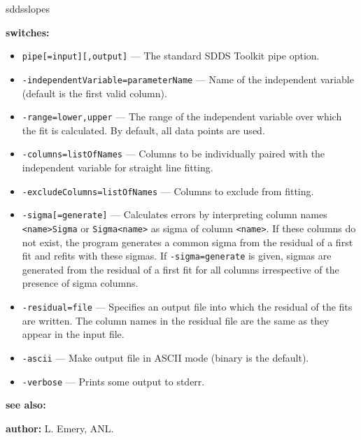 \begin{sddsprog}{sddsslopes}
  \item \textbf{switches:}
  \begin{itemize}
    \item \verb|pipe[=input][,output]| --- The standard SDDS Toolkit pipe option.
    \item \verb|-independentVariable=parameterName| --- Name of the independent variable (default is the first valid column).
    \item \verb|-range=lower,upper| --- The range of the independent variable over which the fit is calculated. By default, all data points are used.
    \item \verb|-columns=listOfNames| --- Columns to be individually paired with the independent variable for straight line fitting.
    \item \verb|-excludeColumns=listOfNames| --- Columns to exclude from fitting.
    \item \verb|-sigma[=generate]| --- Calculates errors by interpreting column names \verb|<name>Sigma| or \verb|Sigma<name>| as sigma of column \verb|<name>|. If these columns do not exist, the program generates a common sigma from the residual of a first fit and refits with these sigmas. If \verb|-sigma=generate| is given, sigmas are generated from the residual of a first fit for all columns irrespective of the presence of sigma columns.
    \item \verb|-residual=file| --- Specifies an output file into which the residual of the fits are written. The column names in the residual file are the same as they appear in the input file.
    \item \verb|-ascii| --- Make output file in ASCII mode (binary is the default).
    \item \verb|-verbose| --- Prints some output to stderr.
  \end{itemize}

  \item \textbf{see also:} 

  \item \textbf{author:} L. Emery, ANL.
\end{sddsprog}

